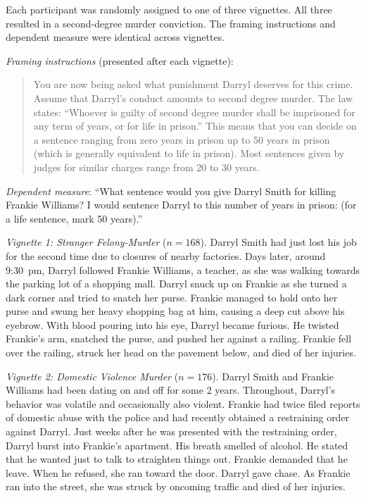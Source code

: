 Each participant was randomly assigned to one of three vignettes. All three resulted in a second-degree murder conviction. The framing instructions and dependent measure were identical across vignettes.

\textit{Framing instructions} (presented after each vignette):
\begin{quote}
You are now being asked what punishment Darryl deserves for this crime. Assume that Darryl's conduct amounts to second degree murder. The law states: ``Whoever is guilty of second degree murder shall be imprisoned for any term of years, or for life in prison.'' This means that you can decide on a sentence ranging from zero years in prison up to 50 years in prison (which is generally equivalent to life in prison). Most sentences given by judges for similar charges range from 20 to 30 years.
\end{quote}

\textit{Dependent measure}: ``What sentence would you give Darryl Smith for killing Frankie Williams? I would sentence Darryl to this number of years in prison: (for a life sentence, mark 50 years).''

\textit{Vignette 1: Stranger Felony-Murder} ($n = 168$). Darryl Smith had just lost his job for the second time due to closures of nearby factories. Days later, around 9:30~pm, Darryl followed Frankie Williams, a teacher, as she was walking towards the parking lot of a shopping mall. Darryl snuck up on Frankie as she turned a dark corner and tried to snatch her purse. Frankie managed to hold onto her purse and swung her heavy shopping bag at him, causing a deep cut above his eyebrow. With blood pouring into his eye, Darryl became furious. He twisted Frankie's arm, snatched the purse, and pushed her against a railing. Frankie fell over the railing, struck her head on the pavement below, and died of her injuries.

\textit{Vignette 2: Domestic Violence Murder} ($n = 176$). Darryl Smith and Frankie Williams had been dating on and off for some 2 years. Throughout, Darryl's behavior was volatile and occasionally also violent. Frankie had twice filed reports of domestic abuse with the police and had recently obtained a restraining order against Darryl. Just weeks after he was presented with the restraining order, Darryl burst into Frankie's apartment. His breath smelled of alcohol. He stated that he wanted just to talk to straighten things out. Frankie demanded that he leave. When he refused, she ran toward the door. Darryl gave chase. As Frankie ran into the street, she was struck by oncoming traffic and died of her injuries.

